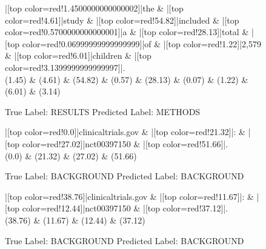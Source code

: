 \documentclass[a4paper, landscape]{article}
\begin{document}
\begin{figure}
\begin{center}
\begin{dependency}
\begin{deptext}
|[top color=red!1.4500000000000002]|the \& |[top color=red!4.61]|study \& |[top color=red!54.82]|included \& |[top color=red!0.5700000000000001]|a \& |[top color=red!28.13]|total \& |[top color=red!0.06999999999999999]|of \& |[top color=red!1.22]|2,579 \& |[top color=red!6.01]|children \& |[top color=red!3.1399999999999997]|.\\
(1.45) \& (4.61) \& (54.82) \& (0.57) \& (28.13) \& (0.07) \& (1.22) \& (6.01) \& (3.14)\\
\end{deptext}
\end{dependency}
\end{center}
\caption{True Label: RESULTS Predicted Label: METHODS}
\end{figure}
\clearpage
\begin{figure}
\begin{center}
\begin{dependency}
\begin{deptext}
|[top color=red!0.0]|clinicaltrials.gov \& |[top color=red!21.32]|: \& |[top color=red!27.02]|nct00397150 \& |[top color=red!51.66]|.\\
(0.0) \& (21.32) \& (27.02) \& (51.66)\\
\end{deptext}
\end{dependency}
\end{center}
\caption{True Label: BACKGROUND Predicted Label: BACKGROUND}
\end{figure}
\clearpage
\begin{figure}
\begin{center}
\begin{dependency}
\begin{deptext}
|[top color=red!38.76]|clinicaltrials.gov \& |[top color=red!11.67]|: \& |[top color=red!12.44]|nct00397150 \& |[top color=red!37.12]|.\\
(38.76) \& (11.67) \& (12.44) \& (37.12)\\
\end{deptext}
\end{dependency}
\end{center}
\caption{True Label: BACKGROUND Predicted Label: BACKGROUND}
\end{figure}
\end{document}
